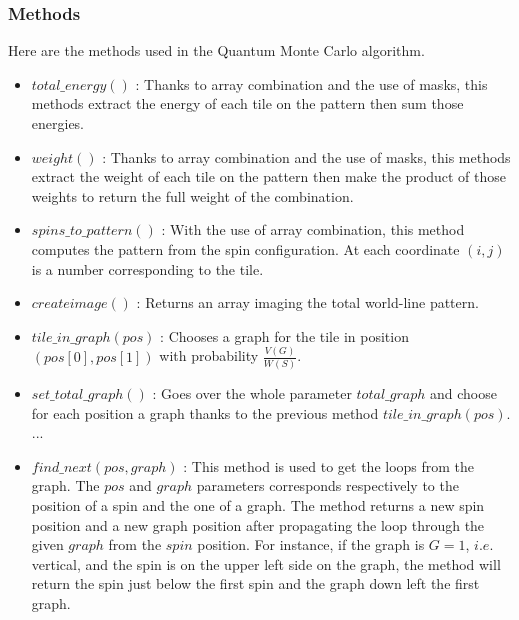 \documentclass[a4paper,12pt,twoside]{article}
\begin{document}
	\subsubsection{Methods}
	Here are the methods used in the Quantum Monte Carlo algorithm. 
	\begin{itemize}[label=$\star$]
		\item $total\_energy()$ : Thanks to array combination and the use of masks, this methods extract the energy of each tile on the pattern then sum those energies.
		\item $weight()$ : Thanks to array combination and the use of masks, this methods extract the weight of each tile on the pattern then make the product of those weights to return the full weight of the combination.
		\item $spins\_to\_pattern()$ : With the use of array combination, this method computes the pattern from the spin configuration. At each coordinate $(i,j)$ is a number corresponding to the tile.
		\item $createimage()$ : Returns an array imaging the total world-line pattern.
		\item $tile\_in\_graph(pos)$ : Chooses a graph for the tile in position $(pos[0], pos[1])$ with probability $\frac{V(G)}{W(S)}$.
		\item $set\_total\_graph()$ : Goes over the whole parameter $total\_graph$ and choose for each position a graph thanks to the previous method $tile\_in\_graph(pos)$. ...
		\item $find\_next(pos, graph)$ : This method is used to get the loops from the graph. The $pos$ and $graph$ parameters corresponds respectively to the position of a spin and the one of a graph. The method returns a new spin position and a new graph position after propagating the loop through the given $graph$ from the $spin$ position. For instance, if the graph is $G = 1$, $i.e.$ vertical, and the spin is on the upper left side on the graph, the method will return the spin just below the first spin and the graph down left the first graph. 
		\begin{figure}[!h]
			

\end{figure}
\end{itemize}
\end{document}
